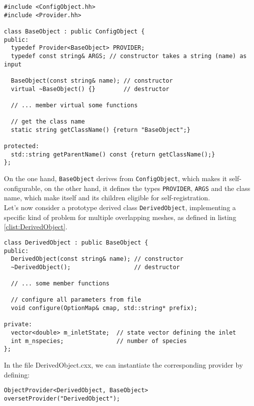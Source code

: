 \documentclass[11pt]{article}
\newcommand{\noi}{\noindent}
\begin{document}
\begin{lstlisting}[basicstyle={\small\sffamily},float=!htb,caption={BaseObject
    class definition.}, label=clist:BaseObject]
#include <ConfigObject.hh>
#include <Provider.hh>

class BaseObject : public ConfigObject {
public:
  typedef Provider<BaseObject> PROVIDER;
  typedef const string& ARGS; // constructor takes a string (name) as input
  
  BaseObject(const string& name); // constructor
  virtual ~BaseObject() {}        // destructor
  
  // ... member virtual some functions
  
  // get the class name
  static string getClassName() {return "BaseObject";}

protected:
  std::string getParentName() const {return getClassName();}
};  
\end{lstlisting}
\noi
On the one hand, \texttt{BaseObject} derives from \texttt{ConfigObject}, which makes it
self-configurable, on the other hand, it defines the types
\texttt{PROVIDER}, \texttt{ARGS} and the class name, which make itself
and its children eligible for self-registration. \\
Let's now consider a prototype derived class \texttt{DerivedObject}, 
implementing a specific kind of problem for multiple overlapping 
meshes, as defined in listing \ref{clist:DerivedObject}. 
\begin{lstlisting}[basicstyle={\small\sffamily},float=!htb,caption={DerivedObject
    class definition.}, label=clist:DerivedObject]
class DerivedObject : public BaseObject {
public:
  DerivedObject(const string& name); // constructor
  ~DerivedObject();                  // destructor
  
  // ... some member functions 
 
  // configure all parameters from file
  void configure(OptionMap& cmap, std::string* prefix);
  
private:
  vector<double> m_inletState;  // state vector defining the inlet
  int m_nspecies;               // number of species
};
\end{lstlisting}
\noi
In the file DerivedObject.cxx, we can instantiate the corresponding provider by defining:
\begin{lstlisting}[basicstyle={\small\sffamily},float=!htb,caption={ObjectProvider
    for DerivedObject defined in DerivedObject.cxx.}, label=clist:DerivedObjectProvider]
  ObjectProvider<DerivedObject, BaseObject> oversetProvider("DerivedObject");
\end{lstlisting}
\end{document}
